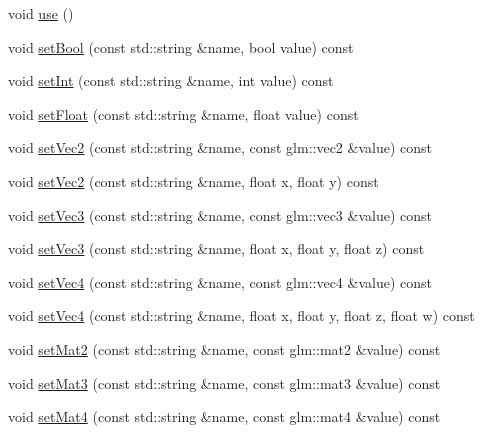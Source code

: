 \begin{DoxyCompactItemize}
\item 
void \hyperlink{classce_1_1graphics_1_1_shader_aca7fefcc416d17e11cf5af7fb36148de}{use} ()
\item 
void \hyperlink{classce_1_1graphics_1_1_shader_a42b65349e86147bbd0fc611eeb4f5890}{set\+Bool} (const std\+::string \&name, bool value) const
\item 
void \hyperlink{classce_1_1graphics_1_1_shader_ab0599b30f759cd140b3c1727673c4665}{set\+Int} (const std\+::string \&name, int value) const
\item 
void \hyperlink{classce_1_1graphics_1_1_shader_a31d56ffb50a079444baf27c863023efc}{set\+Float} (const std\+::string \&name, float value) const
\item 
void \hyperlink{classce_1_1graphics_1_1_shader_a14c07171e23106041bb1dbb683a19d2f}{set\+Vec2} (const std\+::string \&name, const glm\+::vec2 \&value) const
\item 
void \hyperlink{classce_1_1graphics_1_1_shader_aba50173108bd30bcf6f1a4a0446d6a09}{set\+Vec2} (const std\+::string \&name, float x, float y) const
\item 
void \hyperlink{classce_1_1graphics_1_1_shader_ad2ed1ba06e20251009c869e4344605ef}{set\+Vec3} (const std\+::string \&name, const glm\+::vec3 \&value) const
\item 
void \hyperlink{classce_1_1graphics_1_1_shader_aee1a36cd3264b09aed26b99c0fea05ad}{set\+Vec3} (const std\+::string \&name, float x, float y, float z) const
\item 
void \hyperlink{classce_1_1graphics_1_1_shader_a77137819a5a8b7ec1313c19a0aef52b2}{set\+Vec4} (const std\+::string \&name, const glm\+::vec4 \&value) const
\item 
void \hyperlink{classce_1_1graphics_1_1_shader_aa2ce76f7663f91497157017868d4a85e}{set\+Vec4} (const std\+::string \&name, float x, float y, float z, float w) const
\item 
void \hyperlink{classce_1_1graphics_1_1_shader_a6355f9a1480838ce2f1ef8030ef1c259}{set\+Mat2} (const std\+::string \&name, const glm\+::mat2 \&value) const
\item 
void \hyperlink{classce_1_1graphics_1_1_shader_a52a066ab5a24e7f4596931e9c0e325e6}{set\+Mat3} (const std\+::string \&name, const glm\+::mat3 \&value) const
\item 
void \hyperlink{classce_1_1graphics_1_1_shader_ae5f67d260222f5b315ea097b3d898c9f}{set\+Mat4} (const std\+::string \&name, const glm\+::mat4 \&value) const
\end{DoxyCompactItemize}
